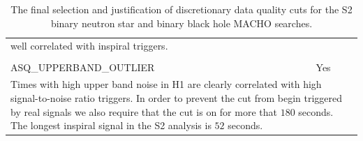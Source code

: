 \begin{table}[p]
\begin{center}
\begin{tabular}{ll}
{{well correlated with inspiral triggers.\baselineskip=14pt}} \\
\\
ASQ\_UPPERBAND\_OUTLIER   & Yes \\
\multicolumn{2}{l}{\parbox{\linewidth}{\footnotesize Times with high upper band
noise in H1 are clearly correlated with high signal-to-noise ratio triggers.
In order to prevent the cut from begin triggered by real signals we also
require that the cut is on for more that $180$ seconds. The longest inspiral
signal in the S2 analysis is $52$ seconds.\baselineskip=14pt}}\\
\end{tabular}
\end{center}
\caption[Choice of Data Quality Cuts in S2]{%
\label{t:s2dqchoice}
The final selection and justification of discretionary data quality cuts for
the S2 binary neutron star and binary black hole MACHO searches.}
\end{table}

